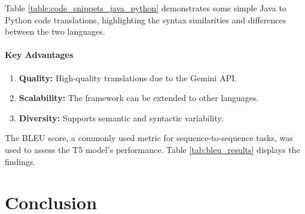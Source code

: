 \documentclass{dhbenelux}
\begin{document}
\begin{table}[h!]
\centering
{}
\caption{Java to Python Code Snippets}
\label{table:code_snippets_java_python}
\end{table}

Table \ref{table:code_snippets_java_python} demonstrates some simple Java to Python code translations, highlighting the syntax similarities and differences between the two languages.

\paragraph{Key Advantages}
\begin{enumerate}
    \item \textbf{Quality:} High-quality translations due to the Gemini API.
    \item \textbf{Scalability:} The framework can be extended to other languages.
    \item \textbf{Diversity:} Supports semantic and syntactic variability.
\end{enumerate}

The BLEU score, a commonly used metric for sequence-to-sequence tasks, was used to assess the T5 model's performance. Table \ref{tab:bleu_results} displays the findings.

\section{Conclusion}
\end{document}
